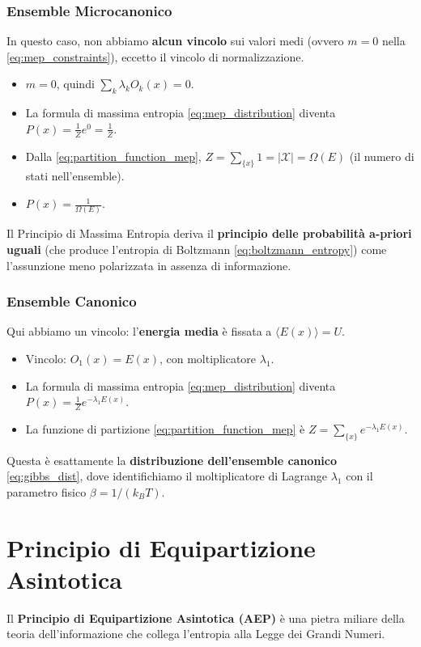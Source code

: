 \begin{enumerate}
\subsubsection{Ensemble Microcanonico}
In questo caso, non abbiamo \textbf{alcun vincolo} sui valori medi (ovvero $m=0$ nella \eqref{eq:mep_constraints}), eccetto il vincolo di normalizzazione.
\begin{itemize}
    \item $m=0$, quindi $\sum_k \lambda_k O_k(x) = 0$.
    \item La formula di massima entropia \eqref{eq:mep_distribution} diventa $P(x) = \frac{1}{Z} e^0 = \frac{1}{Z}$.
    \item Dalla \eqref{eq:partition_function_mep}, $Z = \sum_{\{x\}} 1 = |\mathcal{X}| = \Omega(E)$ (il numero di stati nell'ensemble).
    \item $P(x) = \frac{1}{\Omega(E)}$.
\end{itemize}
Il Principio di Massima Entropia deriva il \textbf{principio delle probabilità a-priori uguali} (che produce l'entropia di Boltzmann \eqref{eq:boltzmann_entropy}) come l'assunzione meno polarizzata in assenza di informazione.

\subsubsection{Ensemble Canonico}
Qui abbiamo un vincolo: l'\textbf{energia media} è fissata a $\langle E(x) \rangle = U$.
\begin{itemize}
    \item Vincolo: $O_1(x) = E(x)$, con moltiplicatore $\lambda_1$.
    \item La formula di massima entropia  \eqref{eq:mep_distribution} diventa $P(x) = \frac{1}{Z} e^{-\lambda_1 E(x)}$.
    \item La funzione di partizione \eqref{eq:partition_function_mep} è $Z = \sum_{\{x\}} e^{-\lambda_1 E(x)}$.
\end{itemize}
Questa è esattamente la \textbf{distribuzione dell'ensemble canonico} \eqref{eq:gibbs_dist}, dove identifichiamo il moltiplicatore di Lagrange $\lambda_1$ con il parametro fisico $\beta = 1/(k_B T)$.


\section{Principio di Equipartizione Asintotica}
Il \textbf{Principio di Equipartizione Asintotica (AEP)} è una pietra miliare della teoria dell'informazione che collega l'entropia alla Legge dei Grandi Numeri.


\end{enumerate}
